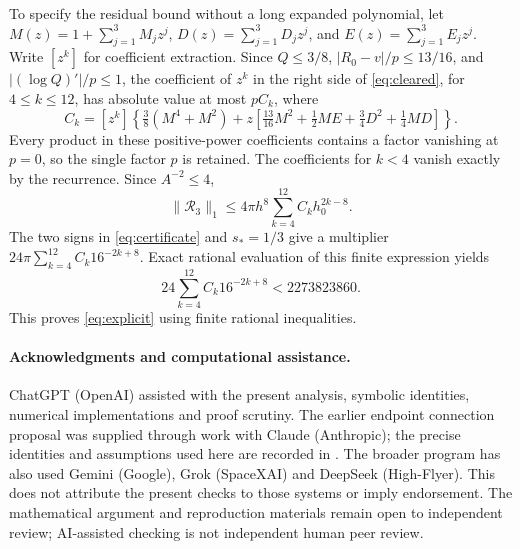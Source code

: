 \documentclass[10pt]{article}
\begin{document}
To specify the residual bound without a long expanded polynomial,
let $M(z)=1+\sum_{j=1}^3M_jz^j$,
$D(z)=\sum_{j=1}^3D_jz^j$, and $E(z)=\sum_{j=1}^3E_jz^j$.
Write $[z^k]$ for coefficient extraction. Since
$Q\le3/8$, $|R_0-v|/p\le13/16$, and
$|(\log Q)'|/p\le1$, the coefficient of $z^k$ in the
right side of \eqref{eq:cleared}, for $4\le k\le12$, has
absolute value at most $p C_k$, where
\begin{equation}
C_k=[z^k]\left\{\tfrac38(M^4+M^2)
 +z\left[\tfrac{13}{16}M^2+\tfrac12ME
                    +\tfrac34D^2+\tfrac14MD\right]\right\}.
\label{eq:Ck}
\end{equation}
Every product in these positive-power coefficients contains a
factor vanishing at $p=0$, so the single factor $p$ is retained.
The coefficients for $k<4$ vanish exactly by the recurrence.
Since $A^{-2}\le4$,
\[
\|\mathcal R_3\|_1\le4\pi h^8
 \sum_{k=4}^{12}C_k h_0^{2k-8}.
\]
The two signs in \eqref{eq:certificate} and $s_*=1/3$ give
a multiplier $24\pi\sum_{k=4}^{12}C_k16^{-2k+8}$.
Exact rational evaluation of this finite expression yields
\[
24\sum_{k=4}^{12}C_k16^{-2k+8}<2273823860.
\]
This proves \eqref{eq:explicit} using finite rational inequalities.

\paragraph{Acknowledgments and computational assistance.}
ChatGPT (OpenAI) assisted with the present analysis, symbolic
identities, numerical implementations and proof scrutiny. The
earlier endpoint connection proposal was supplied through work
with Claude (Anthropic); the precise identities and assumptions
used here are recorded in \cite{tails,moments}. The broader program
has also used Gemini (Google), Grok (SpaceXAI) and DeepSeek
(High-Flyer). This does not attribute the present checks to those
systems or imply endorsement. The mathematical argument and
reproduction materials remain open to independent review;
AI-assisted checking is not independent human peer review.
\end{document}
